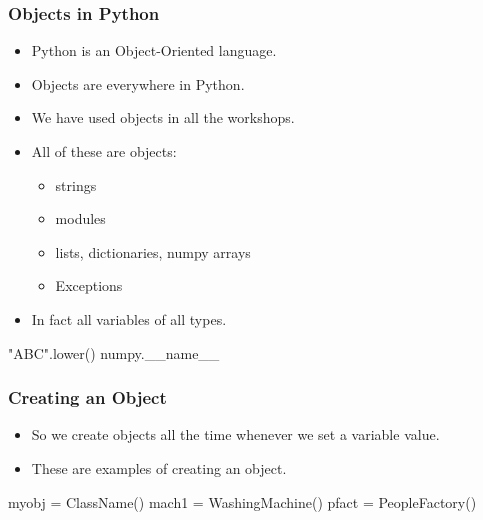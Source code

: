 \documentclass{beamer}
\begin{document}
\begin{frame}[fragile]
\frametitle{Objects in Python}
\begin{itemize}
\item Python is an Object-Oriented language.
\item Objects are everywhere in Python.
\item We have used objects in all the workshops.
\pause
\item All of these are objects:
\begin{itemize}
\item strings
\item modules
\item lists, dictionaries, numpy arrays
\item Exceptions
\end{itemize}
\pause
\item In fact all variables of all types.
\end{itemize}
\begin{code}
"ABC".lower()
numpy.__name__
\end{code}
\end{frame}

\begin{frame}[fragile]
\frametitle{Creating an Object}
\begin{itemize}
\item So we create objects all the time whenever we set a variable value.
\pause
\item These are examples of creating an object.
\end{itemize}

\begin{code}
myobj = ClassName()
mach1 = WashingMachine()
pfact = PeopleFactory()
\end{code}

\end{frame}
\end{document}
